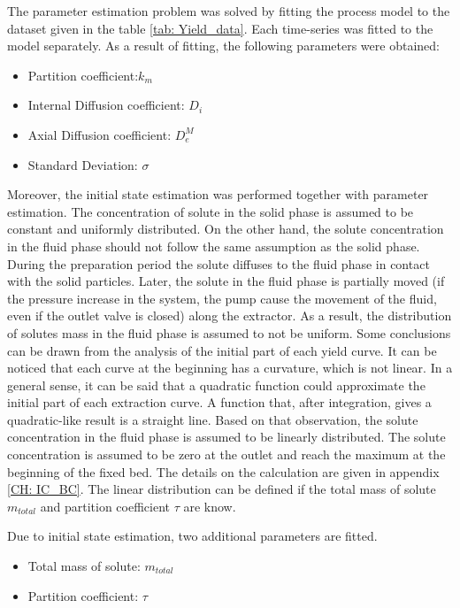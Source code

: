 \documentclass[../Article_Model_Parameters.tex]{subfiles}
\begin{document}
	
	\label{CH: Results}

    The parameter estimation problem was solved by fitting the process model to the dataset given in the table \ref{tab: Yield_data}. Each time-series was fitted to the model separately. As a result of fitting, the following parameters were obtained:

    \begin{itemize}
        \item Partition coefficient:\qquad\quad\qquad$k_m$
        \item Internal Diffusion coefficient: \quad$D_i$
        \item Axial Diffusion coefficient: \qquad$D_e^M$
        \item Standard Deviation: \qquad\qquad\quad$\sigma$
    \end{itemize}

    Moreover, the initial state estimation was performed together with parameter estimation. The concentration of solute in the solid phase is assumed to be constant and uniformly distributed. On the other hand, the solute concentration in the fluid phase should not follow the same assumption as the solid phase. During the preparation period the solute diffuses to the fluid phase in contact with the solid particles. Later, the solute in the fluid phase is partially moved (if the pressure increase in the system, the pump cause the movement of the fluid, even if the outlet valve is closed) along the extractor. As a result, the distribution of solutes mass in the fluid phase is assumed to not be uniform. Some conclusions can be drawn from the analysis of the initial part of each yield curve. It can be noticed that each curve at the beginning has a curvature, which is not linear. In a general sense, it can be said that a quadratic function could approximate the initial part of each extraction curve. A function that, after integration, gives a quadratic-like result is a straight line. Based on that observation, the solute concentration in the fluid phase is assumed to be linearly distributed. The solute concentration is assumed to be zero at the outlet and reach the maximum at the beginning of the fixed bed. The details on the calculation are given in appendix \ref{CH: IC_BC}. The linear distribution can be defined if the total mass of solute $m_{total}$ and partition coefficient $\tau$ are know.
    
    Due to initial state estimation, two additional parameters are fitted.

    \begin{itemize}
        \item Total mass of solute: \qquad\qquad\quad$m_{total}$
        \item Partition coefficient: \qquad\qquad\quad$\tau$
    \end{itemize}
\end{document}

